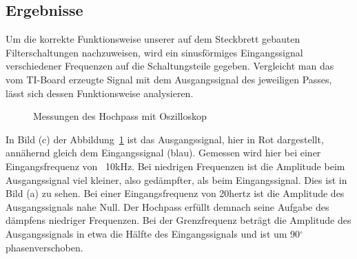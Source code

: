 \subsection{Ergebnisse}
Um die korrekte Funktionsweise unserer auf dem Steckbrett gebauten Filterschaltungen nachzuweisen, wird ein sinusförmiges Eingangssignal verschiedener Frequenzen auf die Schaltungsteile gegeben. Vergleicht man das vom TI-Board erzeugte Signal mit dem Ausgangssignal des jeweiligen Passes, lässt sich dessen Funktionsweise analysieren.\\
\begin{figure}[H]
	\centering
  	\caption{Messungen des Hochpass mit Oszilloskop}  
  	\label{Hochpass Messung} 	
\end{figure}
In Bild (c) der Abbildung~\ref{Hochpass Messung} ist das Ausgangssignal, hier in Rot dargestellt, annähernd gleich dem Eingangssignal (blau). Gemessen wird hier bei einer Eingangsfrequenz von ~10\si{\kilo\hertz}. Bei niedrigen Frequenzen ist die Amplitude beim Ausgangssignal viel kleiner, also gedämpfter, als beim Eingangssignal. Dies ist in Bild (a) zu sehen. Bei einer Eingangsfrequenz von 20\si{hertz} ist die Amplitude des Ausgangssignals nahe Null. Der Hochpass erfüllt demnach seine Aufgabe des dämpfens niedriger Frequenzen. Bei der Grenzfrequenz beträgt die Amplitude des Ausgangssignals in etwa die Hälfte des Eingangssignals und ist um 90$^\circ$ phasenverschoben.\\
